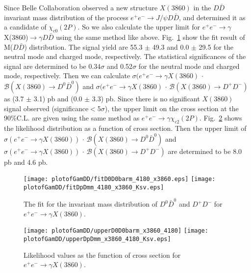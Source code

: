 \documentclass[aps,preprint,tightenlines,superscriptaddress,showpacs,byrevtex,amsmath,amssymb,nofloatfix]{revtex4}
\begin{document}
Since  Belle  Collaboration observed a new structure $X(3860)$ in the $D\bar{D}$ invariant mass distribution of the process $e^{+}e^{-} \to J/\psi D\bar{D}$, and determined it as a candidate of $\chi_{c0}(2P)$. So we also calculate the upper limit for $e^{+}e^{-} \to \gamma $X(3860)$ \to \gamma D\bar{D}$ using the same method like above. Fig.~\ref{fitmDDbar_3860} show the fit result of M($D\bar{D}$) distribution. The signal yield are 55.3 $\pm$ 49.3 and 0.0 $\pm$  29.5 for the neutral mode and charged mode, respectively. The statistical significances of the signal are determined to be 0.34$\sigma$ and 0.52$\sigma$ for the neutral mode and charged mode, respectively. Then we can calculate $\sigma (e^{+}e^{-}\rightarrow \gamma X(3860)$ $\cdot$ $\mathcal{B}(X(3860)\rightarrow  D^{0}\bar{D}^{0})$ and $\sigma (e^{+}e^{-}\rightarrow \gamma X(3860)$ $\cdot$ $\mathcal{B}(X(3860)\rightarrow  D^{+}D^{-})$ as (3.7 $\pm$ 3.1) pb and (0.0 $\pm$ 3.3) pb. Since there is no significant $X(3860)$ signal observed (significance$<$5$\sigma$), the upper limit on the cross section at the 90\%C.L. are given using the same method as $e^{+}e^{-}\to\gamma \chi_{c2}(2P)$. Fig.~\ref{FitDDbar_3860_up} shows the likelihood distribution as a function of cross section. Then the upper limit of $\sigma (e^{+}e^{-}\rightarrow \gamma X(3860))$ $\cdot$ $\mathcal{B}(X(3860)\rightarrow  D^{0}\bar{D}^{0})$ and  $\sigma (e^{+}e^{-}\rightarrow \gamma X(3860))$ $\cdot$ $\mathcal{B}(X(3860)\rightarrow D^{+}D^{-})$ are determined to be 8.0 pb and 4.6 pb.

\begin{figure}[!htbp]
  \captionsetup{justification=raggedright}
    \texttt{[image: plotofGamDD/fitD0D0barm\_4180\_x3860.eps]}
    \texttt{[image: plotofGamDD/fitDpDmm\_4180\_x3860\_Ksv.eps]}
  \caption{\small The fit for the invariant mass distribution of $D^{0}\bar{D}^{0}$ and $D^{+}D^{-}$ for $e^{+}e^{-} \rightarrow \gamma X(3860)$.}
  \label{fitmDDbar_3860}
\end{figure}


\begin{figure}[!htbp]
\captionsetup{justification=raggedright}
    \texttt{[image: plotofGamDD/upperD0D0barm\_x3860\_4180]}
    \texttt{[image: plotofGamDD/upperDpDmm\_x3860\_4180\_Ksv.eps]}
  \caption{\small Likelihood values as the function of cross section for $e^{+}e^{-} \rightarrow \gamma X(3860)$.}
  \label{FitDDbar_3860_up}
\end{figure}
\end{document}
